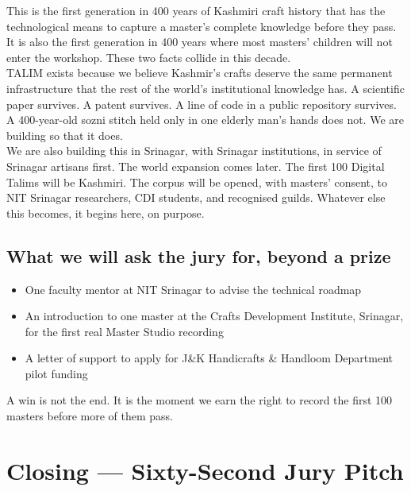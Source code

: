 \documentclass[11pt, a4paper]{article}
\begin{document}
\begin{kashmirbox}
This is the first generation in 400 years of Kashmiri craft history that has the technological means to capture a master's complete knowledge before they pass. It is also the first generation in 400 years where most masters' children will not enter the workshop. These two facts collide in this decade.\\[5pt]
TALIM exists because we believe Kashmir's crafts deserve the same permanent infrastructure that the rest of the world's institutional knowledge has. A scientific paper survives. A patent survives. A line of code in a public repository survives. A 400-year-old sozni stitch held only in one elderly man's hands does not. We are building so that it does.\\[5pt]
We are also building this in Srinagar, with Srinagar institutions, in service of Srinagar artisans first. The world expansion comes later. The first 100 Digital Talims will be Kashmiri. The corpus will be opened, with masters' consent, to NIT Srinagar researchers, CDI students, and recognised guilds. Whatever else this becomes, it begins here, on purpose.
\end{kashmirbox}

\subsection{What we will ask the jury for, beyond a prize}

\begin{itemize}
  \item One faculty mentor at NIT Srinagar to advise the technical roadmap
  \item An introduction to one master at the Crafts Development Institute, Srinagar, for the first real Master Studio recording
  \item A letter of support to apply for J\&K Handicrafts \& Handloom Department pilot funding
\end{itemize}

A win is not the end. It is the moment we earn the right to record the first 100 masters before more of them pass.

\section{Closing — Sixty-Second Jury Pitch}
\end{document}
